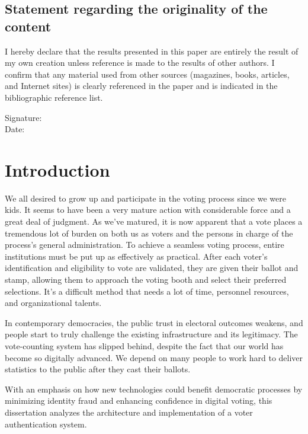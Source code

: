 \documentclass[a4paper,10pt]{report}
\begin{document}
\newpage

\section*{Statement regarding the originality of the content}

I hereby declare that the results presented in this paper are entirely the result of my own creation unless reference is made to the results of other authors. I confirm that any material used from other sources (magazines, books, articles, and Internet sites) is clearly referenced in the paper and is indicated in the bibliographic reference list.

\vspace{2cm}

\noindent Signature: \dotfill\\
Date: \dotfill

\newpage

\tableofcontents

\newpage

\chapter{Introduction}

We all desired to grow up and participate in the voting process since we were kids.  It seems to have been a very mature action with considerable force and a great deal of judgment.  As we've matured, it is now apparent that a vote places a tremendous lot of burden on both us as voters and the persons in charge of the process's general administration.  To achieve a seamless voting process, entire institutions must be put up as effectively as practical.  After each voter's identification and eligibility to vote are validated, they are given their ballot and stamp, allowing them to approach the voting booth and select their preferred selections.  It's a difficult method that needs a lot of time, personnel resources, and organizational talents.

 In contemporary democracies, the public trust in electoral outcomes weakens, and people start to truly challenge the existing infrastructure and its legitimacy.  The vote-counting system has slipped behind, despite the fact that our world has become so digitally advanced.  We depend on many people to work hard to deliver statistics to the public after they cast their ballots.

 With an emphasis on how new technologies could benefit democratic processes by minimizing identity fraud and enhancing confidence in digital voting, this dissertation analyzes the architecture and implementation of a voter authentication system.
\end{document}
